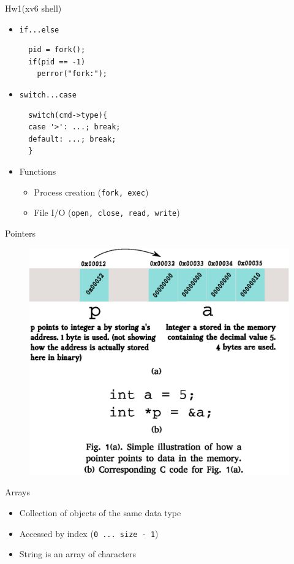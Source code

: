 \documentclass[10pt]{beamer}
\begin{document}
\begin{frame}[fragile]{Hw1(xv6 shell)}
\begin{itemize}
\item<1-> \texttt{if...else}
\begin{verbatim}
  pid = fork();
  if(pid == -1)
    perror("fork:");
\end{verbatim}
\item<2-> \texttt{switch...case}
\begin{verbatim}
  switch(cmd->type){
  case '>': ...; break;
  default: ...; break;
  }
\end{verbatim}
\item<3-> Functions
\begin{itemize}
\item Process creation (\texttt{fork, exec})
\item File I/O (\texttt{open, close, read, write})
\end{itemize}
\end{itemize}
\end{frame}

\begin{frame}{Pointers}
  \begin{figure}
    \includegraphics[scale=0.5]{figs/pointers.eps}
  \end{figure}
  \end{frame}

\begin{frame}[fragile]{Arrays}
\begin{itemize}
\item<1-> Collection of objects of the same data type
\item<2-> Accessed by index (\texttt{0 ... size - 1})
\item<3-> String is an array of characters 
\end{itemize}
\end{frame}
\end{document}
